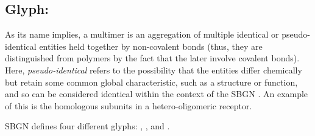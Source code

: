 \subsection{Glyph: }
\label{sec:multimer}

As its name implies, a multimer is an aggregation of multiple identical or pseudo-identical entities held together by non-covalent bonds (thus, they are distinguished from polymers by the fact that the later involve covalent bonds).
Here,  \emph{pseudo-identical} refers to the possibility that the entities differ chemically but retain some common global characteristic, such as a structure or function, and so can be considered identical within the context of the SBGN \PD.
An example of this is the homologous subunits in a hetero-oligomeric receptor.

SBGN \PD defines four different  glyphs: , ,  and .

